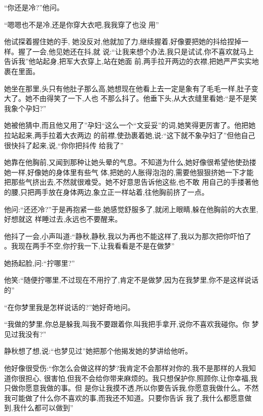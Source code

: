 ﻿\documentclass[12pt]{article}
\begin{document}
``你\myrule 还是冷?''他问。

``嗯\myrule 嗯\myrule 也\myrule 不是冷\myrule ,还是你\myrule 穿大\myrule 衣吧,我\myrule 我穿了也没
\myrule 用\myrule ''

他试探着握住她的手, 她没反对,他就加了力,继续握着,好像要把她的抖给捏掉一样。握了一会,他见她还在抖,就
说:``让我来想个办法\myrule ,我只是试试,你不喜欢就马上告诉我\myrule ''他站起身,把军大衣穿上,站在她面
前,两手拉开两边的衣襟,把她严严实实地裹在里面。

她坐在那里,头只有他肚子那么高,她想现在他看上去一定是象有了毛毛一样,肚子变大了。她不由得笑了一下,人也
不那么抖了。他垂下头,从大衣缝里看她:``是不是笑我象个孕妇?''

她被他猜中,而且他又用了''孕妇``这么一个``文妥妥''的词,她笑得更厉害了。他把她拉站起来,两手拉着大衣两边
的前襟,使劲裹着她,说:``这下就不象孕妇了\myrule ''但他自己很快抖了起来,说,``你\myrule 你把\myrule 抖传
给我了\myrule ''

她靠在他胸前,又闻到那种让她头晕的气息。不知道为什么,她好像很希望他使劲搂她一样,好像她的身体里有些气
体,把她的人胀得泡泡的,需要他狠狠挤她一下才能把那些气挤出去,不然就很难受。她不好意思告诉他这些,也不敢
用自己的手搂著他的腰,只把两手放在身体两边,象立正一样站着,往他胸前挤了一点。

他问:``还\myrule 还\myrule 冷?''于是再抱紧一些,她感觉舒服多了,就闭上眼睛,躲在他胸前的大衣里,好想就这
样睡过去,永远也不要醒来。

他抖了一会,小声叫道:``静秋,静秋,我以为\myrule 再也不能这样\myrule 了,我以为那次把你\myrule 吓怕了
\myrule 。我\myrule 现在两手不空,你拧我一下,让我看看是不是在做梦\myrule ''

她扬起脸,问:``拧哪里?''

他笑:``随便拧哪里,不过现在不用拧了,肯定不是做梦,因为在我梦里,你不是这样说话的\myrule ''

``在你梦里我是怎样说话的?''她好奇地问。

``我做的梦里,你\myrule 总是躲我,叫我不要跟着你,叫我把手\myrule 拿开,说你不喜欢我碰你\myrule 。你
\myrule 梦见过我没有?''

静秋想了想,说:``也梦见过\myrule ''她把那个他揭发她的梦讲给他听。

他好像很受伤:``你怎么会做这样的梦?我肯定不会那样对你的\myrule ,我不是那样的人\myrule 我知道你很担心,
很害怕,但我\myrule 不会给你带来麻烦的\myrule 。我只想保护你,照顾你,让你幸福,我只做你愿意我做的事。但
是你让我摸不透,所以你要告诉我,你愿意我做什么。不然我可能做了什么你不喜欢的事,而我还不知道。只要你告诉
我了,我什么都愿意做到,我什么都可以做到\myrule ''
\end{document}
